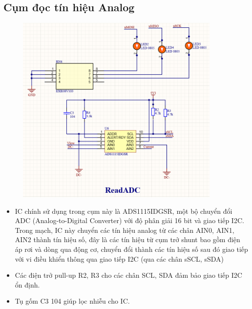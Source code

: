 \subsection{Cụm đọc tín hiệu Analog}
\begin{figure}[H]
    \centering
    \includegraphics[width=0.9\textwidth]{pictures/readADC.png}
\end{figure}
\begin{itemize}
    \item IC chính sử dụng trong cụm này là ADS1115IDGSR, một bộ chuyển đổi ADC (Analog-to-Digital Converter) với độ phân giải 16 bit và giao tiếp I2C.
    Trong mạch, IC này chuyển các tín hiệu analog từ các chân AIN0, AIN1, AIN2 thành tín hiệu số, đây là các tín hiệu từ cụm trở shunt bao gồm điện áp rơi và dòng qua động cơ, chuyển đổi thành các tín hiệu số
    sau đó giao tiếp với vi điều khiển thông qua giao tiếp I2C (qua các chân sSCL, sSDA)
    \item Các điện trở pull-up R2, R3 cho các chân SCL, SDA đảm bảo giao tiếp I2C ổn định.
    \item Tụ gốm C3 104 giúp lọc nhiễu cho IC.
\end{itemize}


